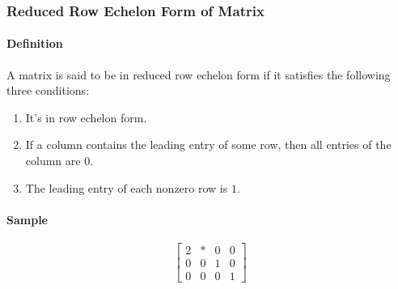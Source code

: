 \documentclass[14pt]{article}
\begin{document}
\begin{CJK}{UTF8}{min}
\subsubsection{Reduced Row Echelon Form of Matrix}
\paragraph{Definition}
A matrix is said to be in reduced row echelon form if it satisfies the following three conditions:
\begin{enumerate}
\item It's in row echelon form.
\item If a column contains the leading entry of some row, then all entries of the column are $0$.
\item The leading entry of each nonzero row is $1$.
\end{enumerate}
\paragraph{Sample}
\begin{equation}
\left[
\begin{array}{cccc}
2 & * & 0 & 0\\
0 & 0 & 1 & 0\\
0 & 0 & 0 & 1
\end{array}
\right]
\end{equation}

\end{CJK}
\end{document}
